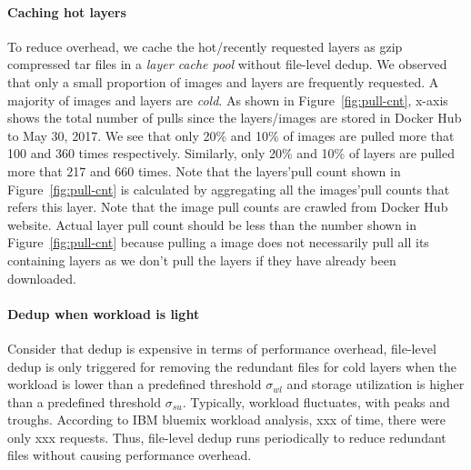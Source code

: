 \paragraph{Caching hot layers}
%
To reduce overhead, we cache the hot/recently requested layers as gzip compressed tar files in a \textit{layer cache pool} without file-level dedup.
We observed that only a small proportion of images and layers are frequently requested. A majority of images and layers are \textit{cold}.
%
%
As shown in Figure~\ref{fig:pull-cnt}, x-axis shows the total number of pulls since the layers/images are stored in Docker Hub to May 30, 2017. 
We see that only 20\% and 10\% of images are pulled more that 100 and 360 times respectively. 
Similarly, only 20\% and 10\% of layers are pulled more that 217 and 660 times. 
Note that 
the layers'pull count shown in Figure~\ref{fig:pull-cnt} is calculated by aggregating all the images'pull counts that refers this layer.
Note that the image pull counts are crawled from Docker Hub website.
Actual layer pull count should be less than the number shown in Figure~\ref{fig:pull-cnt} because pulling a image does not necessarily pull all its containing layers as we don't pull the layers if they have already been downloaded.
%

%
 
\paragraph{Dedup when workload is light}Consider that dedup is expensive in terms of performance overhead, file-level dedup is only triggered for removing the redundant files for cold layers when the workload is lower than a predefined threshold $\sigma_{wl}$ and storage utilization is higher than a predefined threshold $\sigma_{su}$. 
Typically, workload fluctuates, with peaks and troughs. According to IBM bluemix workload analysis\cite{xxx}, xxx of time, there were only xxx requests. %
Thus, file-level dedup runs periodically to reduce redundant files without causing performance overhead. 
%
%

